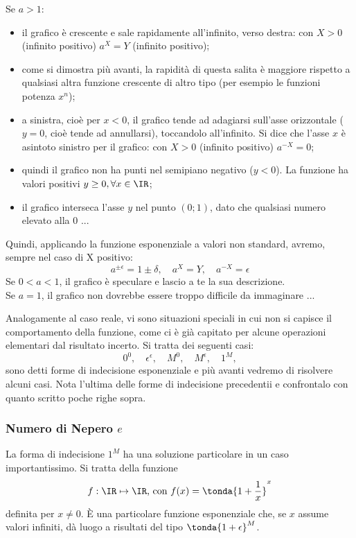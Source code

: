 Se $a>1$:
\begin{itemize} [noitemsep]
 \item 
il grafico è crescente e sale rapidamente all'infinito, verso destra: 
con $X>0$ (infinito positivo) $a^X=Y$ (infinito positivo);
 \item 
come si dimostra più avanti, la rapidità di questa salita è maggiore rispetto 
a qualsiasi altra funzione crescente di altro tipo (per esempio le funzioni 
potenza $x^n$);
 \item
a sinistra, cioè per $x<0$, il grafico tende ad adagiarsi sull'asse
orizzontale ($y=0$, cioè tende ad annullarsi), toccandolo all'infinito. Si
dice che l'asse $x$ è asintoto sinistro per il grafico: con $X>0$ (infinito
positivo) $a^{-X}=0$;
 \item
quindi il grafico non ha punti nel semipiano negativo ($y<0$). La funzione ha
valori positivi $y\ge 0, \forall x\in \IR$;
 \item
il grafico interseca l'asse $y$ nel punto $(0;1)$, dato che qualsiasi numero
elevato alla 0 ...
\end{itemize}
Quindi, applicando la funzione esponenziale a valori non standard, avremo,
sempre nel caso di X positivo: 
\[
 a^{\pm\epsilon} = 1 \pm \delta, \quad a^X = Y,\quad a^{-X} = \epsilon
\]
Se $0<a<1$, il grafico è speculare e lascio a te la sua descrizione.\\
Se $a=1$, il grafico non dovrebbe essere troppo difficile da immaginare ...



\begin{osservazione}
 Analogamente al caso reale, vi sono situazioni speciali in cui non si 
capisce il 
 comportamento della funzione, come ci è già capitato per alcune operazioni 
elementari
 dal risultato incerto. Si tratta dei seguenti casi:
 \[
  0^0,\quad \epsilon^\epsilon, \quad M^0, \quad M^\epsilon, \quad 1^M,
 \]
  sono detti forme di indecisione esponenziale e più avanti vedremo di 
risolvere
  alcuni casi.
  Nota l'ultima delle forme di indecisione precedentii e confrontalo con 
  quanto scritto poche righe sopra.
\end{osservazione}

\subsubsection{Numero di Nepero $e$}
\label{subsubsec:insnum_nepero}
La forma di indecisione $1^M$ ha una soluzione particolare in un caso 
importantissimo. Si tratta della funzione
\[
 f:\IR\mapsto \IR \text{, con } f(x)= \tonda{1+\frac{1}{x}}^x
\]
definita per $x\ne 0$. È una particolare funzione esponenziale che,
se $x$ assume valori infiniti, dà luogo a risultati 
del tipo \(\tonda{1+ \epsilon}^M\).

